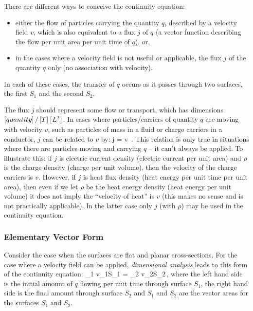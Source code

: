 There are different ways to conceive the continuity equation:
\begin{itemize}
\item either the flow of particles carrying the quantity $q$, described by a velocity field $v$, which is also equivalent to a flux $j$ of $q$ (a vector function describing the flow per unit area per unit time of $q$), or,
\item in the cases where a velocity field is not useful or applicable, the flux $j$ of the quantity $q$ only (no association with velocity).
\end{itemize}
In each of these cases, the transfer of $q$ occurs as it passes through two surfaces, the first $S_1$ and the second $S_2$.

The flux $j$ should represent some flow or transport, which has dimensions $\left[{quantity}\right]/\left[{T}\right]\left[{L^2}\right]$. In cases where particles/carriers of quantity $q$ are moving with velocity $v$, such as particles of mass in a fluid or charge carriers in a conductor, $j$ can be related to $v$ by:
\beq
j = \rho v \,.
\eeq
This relation is only true in situations where there are particles moving and carrying $q$ -- it can't always be applied. To illustrate this: if $j$ is electric current density (electric current per unit area) and $\rho$ is the charge density (charge per unit volume), then the velocity of the charge carriers is $v$. However, if $j$ is heat flux density (heat energy per unit time per unit area), then even if we let $\rho$ be the heat energy density (heat energy per unit volume) it does not imply the ``velocity of heat'' is $v$ (this makes no sense and is not practically applicable). In the latter case only $j$ (with $\rho$) may be used in the continuity equation.


\subsubsection{Elementary Vector Form}
Consider the case when the surfaces are flat and planar cross-sections. For the case where a velocity field can be applied, \emph{dimensional analysis} leads to this form of the continuity equation:
\beq
\rho_1 v_1\iprod S_1 = \rho_2 v_2\iprod S_2\,,
\eeq
where the left hand side is the initial amount of $q$ flowing per unit time through surface $S_1$, the right hand side is the final amount through surface $S_2$ and $S_1$ and $S_2$ are the vector areas for the surfaces $S_1$ and $S_2$.

